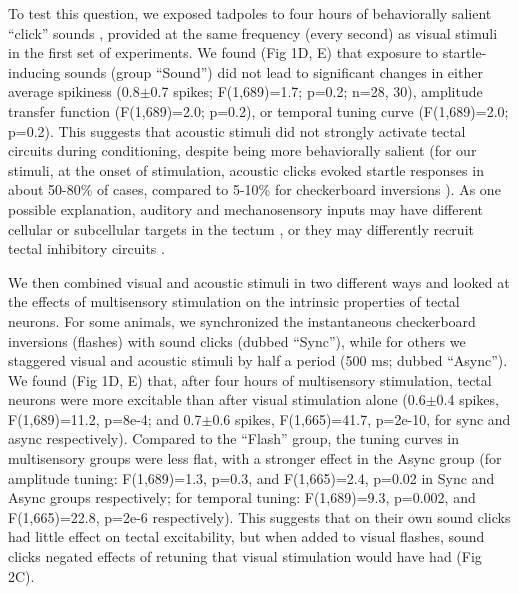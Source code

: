 \documentclass{article}
\begin{document}
To test this question, we exposed tadpoles to four hours of behaviorally salient “click” sounds \citep{james2015,truszkowski2017}, provided at the same frequency (every second) as visual stimuli in the first set of experiments. We found (Fig 1D, E) that exposure to startle-inducing sounds (group “Sound”) did not lead to significant changes in either average spikiness (0.8$\pm$0.7 spikes; F(1,689)=1.7; p=0.2; n=28, 30), amplitude transfer function (F(1,689)=2.0; p=0.2), or temporal tuning curve (F(1,689)=2.0; p=0.2). This suggests that acoustic stimuli did not strongly activate tectal circuits during conditioning, despite being more behaviorally salient (for our stimuli, at the onset of stimulation, acoustic clicks evoked startle responses in about 50-80\% of cases, compared to 5-10\% for checkerboard inversions \citep{james2015,truszkowski2017}). As one possible explanation, auditory and mechanosensory inputs may have different cellular or subcellular targets in the tectum \citep{bollmann2009}, or they may differently recruit tectal inhibitory circuits \citep{liu2016,hamodi2016}.

We then combined visual and acoustic stimuli in two different ways and looked at the effects of multisensory stimulation on the intrinsic properties of tectal neurons. For some animals, we synchronized the instantaneous checkerboard inversions (flashes) with sound clicks (dubbed “Sync”), while for others we staggered visual and acoustic stimuli by half a period (500 ms; dubbed “Async”). We found (Fig 1D, E) that, after four hours of multisensory stimulation, tectal neurons were more excitable than after visual stimulation alone (0.6$\pm$0.4 spikes, F(1,689)=11.2, p=8e-4; and 0.7$\pm$0.6 spikes, F(1,665)=41.7, p=2e-10, for sync and async respectively). Compared to the “Flash” group, the tuning curves in multisensory groups were less flat, with a stronger effect in the Async group (for amplitude tuning: F(1,689)=1.3, p=0.3, and F(1,665)=2.4, p=0.02 in Sync and Async groups respectively; for temporal tuning: F(1,689)=9.3, p=0.002, and F(1,665)=22.8, p=2e-6 respectively). This suggests that on their own sound clicks had little effect on tectal excitability, but when added to visual flashes, sound clicks negated effects of retuning that visual stimulation would have had (Fig 2C).
\end{document}
